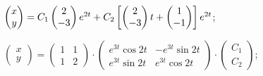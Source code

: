\begin{enumsolsfull}
		\item \( \begin{pmatrix} x \\ y \end{pmatrix} = C_1 \begin{pmatrix} 2 \\ -3 \end{pmatrix} e^{2t} + C_2 \left[ \begin{pmatrix} 2 \\ -3 \end{pmatrix}t + \begin{pmatrix} 1 \\ -1 \end{pmatrix} \right] e^{2t} \); %
		\item \( \begin{pmatrix} x \\ y \end{pmatrix} = \begin{pmatrix} 1 & 1 \\ 1 & 2 \end{pmatrix} \cdot \begin{pmatrix} e^{3t} \cos{2t} & -e^{3t} \sin{2t} \\ e^{3t} \sin{2t} & e^{3t} \cos{2t} \end{pmatrix} \cdot \begin{pmatrix} C_1 \\ C_2 \end{pmatrix} \); %

\end{enumsolsfull}
